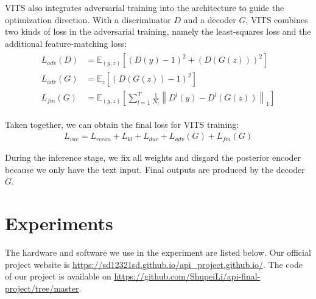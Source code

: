 \documentclass{article}
\begin{document}
VITS also integrates adversarial training into the architecture to guide the optimization direction. With a discriminator $D$ and a decoder $G$, VITS combines two kinds of loss in the adversarial training, namely the least-squares loss and the additional feature-matching loss:
\begin{align}
    \begin{split}
        L_{a d v}(D) & =\mathbb{E}_{(y, z)}\left[(D(y)-1)^{2}+(D(G(z)))^{2}\right] \\
        L_{a d v}(G) & =\mathbb{E}_{z}\left[(D(G(z))-1)^{2}\right] \\
        L_{f m}(G) & =\mathbb{E}_{(y, z)}\left[\sum_{l=1}^{T} \frac{1}{N_{l}}\left\|D^{l}(y)-D^{l}(G(z))\right\|_{1}\right]
    \end{split}
\end{align}

Taken together, we can obtain the final loss for VITS training:
\begin{align}
    L_{v a e}=L_{r e c o n}+L_{k l}+L_{d u r}+L_{a d v}(G)+L_{f m}(G)
\end{align}

During the inference stage, we fix all weights and disgard the posterior encoder because we only have the text input. Final outputs are produced by the decoder $G$.

\section{Experiments}
\label{sec:exper}
The hardware and software we use in the experiment are listed below. Our official project website is \url{https://sd12321sd.github.io/api_project.github.io/}. The code of our project is available on \url{ https://github.com/ShupeiLi/api-final-project/tree/master}.
\end{document}
